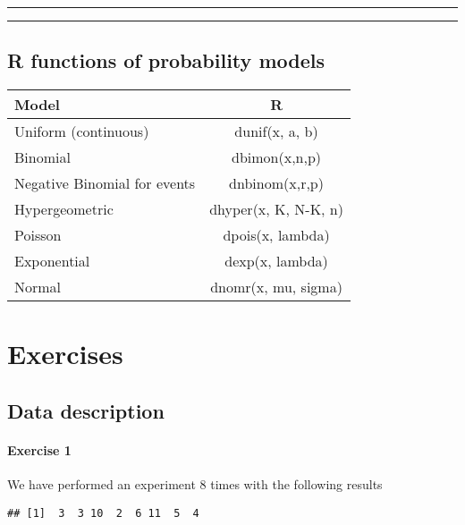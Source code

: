 \documentclass[
]{book}
\begin{document}
\begin{center}\rule{0.5\linewidth}{0.5pt}\end{center}

\begin{center}\rule{0.5\linewidth}{0.5pt}\end{center}

\hypertarget{r-functions-of-probability-models}{%
\section{R functions of probability models}\label{r-functions-of-probability-models}}

\begin{longtable}[]{@{}lc@{}}
\toprule
Model & R \\
\midrule
\endhead
Uniform (continuous) & dunif(x, a, b) \\
Binomial & dbimon(x,n,p) \\
Negative Binomial for events & dnbinom(x,r,p) \\
Hypergeometric & dhyper(x, K, N-K, n) \\
Poisson & dpois(x, lambda) \\
Exponential & dexp(x, lambda) \\
Normal & dnomr(x, mu, sigma) \\
\bottomrule
\end{longtable}

\hypertarget{exercises}{%
\chapter{Exercises}\label{exercises}}

\hypertarget{data-description-1}{%
\section{Data description}\label{data-description-1}}

\hypertarget{exercise-1}{%
\subsubsection{Exercise 1}\label{exercise-1}}

We have performed an experiment 8 times with the following results

\begin{verbatim}
## [1]  3  3 10  2  6 11  5  4
\end{verbatim}
\end{document}
